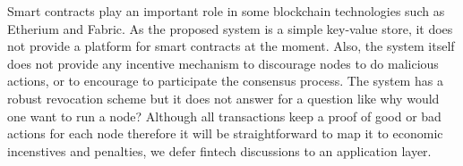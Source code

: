 Smart contracts play an important role in some blockchain technologies
such as Etherium and Fabric. As the proposed system is a simple
key-value store, it does not provide a platform for smart contracts at
the moment. Also, the system itself does not provide any incentive
mechanism to discourage nodes to do malicious actions, or to encourage
to participate the consensus process. The system has a robust
revocation scheme but it does not answer for a question like why would
one want to run a node? Although all transactions keep a proof of good
or bad actions for each node therefore it will be straightforward to
map it to economic incenstives and penalties, we defer fintech
discussions to an application layer.
